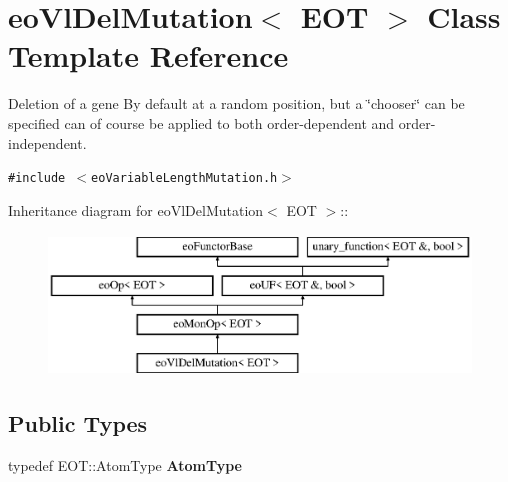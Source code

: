 \section{eo\-Vl\-Del\-Mutation$<$ EOT $>$ Class Template Reference}
\label{classeo_vl_del_mutation}
Deletion of a gene By default at a random position, but a \char`\"{}chooser\char`\"{} can be specified can of course be applied to both order-dependent and order-independent.  


{\tt \#include $<$eo\-Variable\-Length\-Mutation.h$>$}

Inheritance diagram for eo\-Vl\-Del\-Mutation$<$ EOT $>$::\begin{figure}[H]
\begin{center}
\leavevmode
\includegraphics[height=3.71476cm]{classeo_vl_del_mutation}
\end{center}
\end{figure}
\subsection*{Public Types}
\begin{CompactItemize}
\item 
typedef EOT::Atom\-Type {\bf Atom\-Type}\label{classeo_vl_del_mutation_w0}

\end{CompactItemize}
